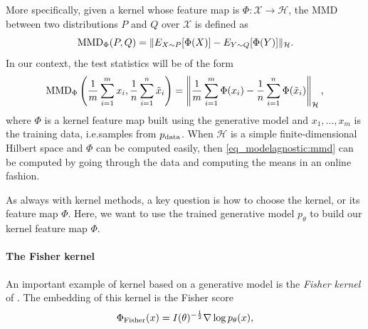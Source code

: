 {More specifically, given a kernel whose feature map is $\Phi : \mathcal{X} \to \mathcal{H}$, the MMD between two distributions $P$ and $Q$ over $\mathcal{X}$ is defined as
\begin{equation}
    \textup{MMD}_\Phi(P,Q) = \| E_{X\sim P}[\Phi(X)] - E_{Y\sim Q}[\Phi(Y)] \|_\mathcal{H}. \hspace{-.1em}
\end{equation}
In our context, the test statistics will be of the form
\begin{equation}
    \label{eq_modelagnostic:mmd}
    \textup{MMD}_\Phi\left(\frac{1}{m}\sum_{i=1}^{m} x_i,\frac{1}{n}\sum_{i=1}^n \tilde{x}_i\right) = \left\|\frac{1}{m}\sum_{i=1}^{m} \Phi(x_i) -  \frac{1}{n}\sum_{i=1}^{n} \Phi(\tilde{x}_i)\right\|_\mathcal{H},
\end{equation}
where $\Phi$ is a kernel feature map built using the generative model and $x_1,\ldots,x_m$ is the training data, i.e.\@ samples from  $p_\textup{data}$. When $\mathcal{H}$ is a simple finite-dimensional Hilbert space and $\Phi$ can be computed easily, then \cref{eq_modelagnostic:mmd} can be computed by going through the data and computing the means in an online fashion.%

As always with kernel methods, a key question is how to choose the kernel, or its feature map $\Phi$.
Here, we want to use the trained generative model $p_\theta$ to build our kernel feature map $\Phi$.

\paragraph{The Fisher kernel} An important example of kernel based on a generative model is the \emph{Fisher kernel} of \textcite{jaakkola_exploiting_1999}. The embedding of this kernel is the Fisher score 
\begin{equation}
    \label{eq_modelagnostic:Fisher_score}
    \Phi_\textup{Fisher} (x) = I(\theta)^{-\frac{1}{2}} \nabla \log p_\theta (x),
\end{equation}

}
